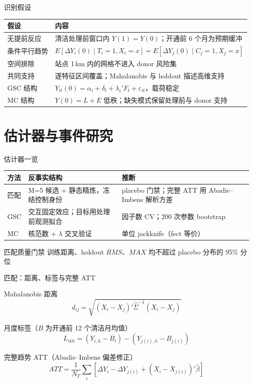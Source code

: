 \documentclass[aspectratio=169,11pt]{beamer}
\begin{document}
\begin{frame}{识别假设}
  \small
  \begin{tabular}{p{}p{}}
    \toprule
    假设 & 内容 \\
    \midrule
    无提前反应 & 清洁处理前窗口内 $Y(1)=Y(0)$；开通前 6 个月为预期缓冲 \\
    条件平行趋势 & $E[\Delta Y_i(0)\mid T_i=1,X_i=x]=E[\Delta Y_j(0)\mid C_j=1,X_j=x]$ \\
    空间排除 & 站点 1\,km 内的网格不进入 donor 风险集 \\
    共同支持 & 逐特征区间覆盖；Mahalanobis 与 holdout 描述高维支持 \\
    GSC 结构 & $Y_{it}(0)=\alpha_i+\delta_t+\lambda_i'F_t+\varepsilon_{it}$，载荷稳定 \\
    MC 结构 & $Y(0)=L+E$ 低秩；缺失模式保留处理前与 donor 支持 \\
    \bottomrule
  \end{tabular}
\end{frame}

\section{估计器与事件研究}

\begin{frame}{估计器一览}
  \small
  \begin{tabular}{p{}p{}p{}}
    \toprule
    方法 & 反事实结构 & 推断 \\
    \midrule
    匹配 & M=5 候选 + 静态精炼，冻结控制身份 & placebo 门禁；完整 ATT 用 Abadie--Imbens 解析方差 \\
    GSC & 交互固定效应；目标用处理前观测拟合 & 因子数 CV；200 次参数 bootstrap \\
    MC & 核范数 + $\lambda$ 交叉验证 & 单位 jackknife（fect 等价） \\
    \bottomrule
  \end{tabular}
  \medskip
  \begin{block}{匹配质量门禁}
    \small 训练距离、holdout $RMS$、$MAX$ 均不超过 placebo 分布的 95\% 分位
  \end{block}
\end{frame}

\begin{frame}{匹配：距离、标签与完整 ATT}
  \small
  \begin{block}{Mahalanobis 距离}
    \[
      d_{ij}=\sqrt{(X_i-X_j)'\hat\Sigma^{-1}(X_i-X_j)}
    \]
  \end{block}
  \begin{block}{月度标签（$B$ 为开通前 12 个清洁月均值）}
    \[
      L_{ikh}=(Y_{i,h}-B_i)-(Y_{j(i),h}-B_{j(i)})
    \]
  \end{block}
  \begin{block}{完整趋势 ATT（Abadie--Imbens 偏差修正）}
    \[
      ATT=\frac{1}{N_T}\sum_i
      \left[\Delta Y_i-\Delta Y_{j(i)}+(X_i-X_{j(i)})'\hat\beta\right]
    \]
  \end{block}
\end{frame}
\end{document}
